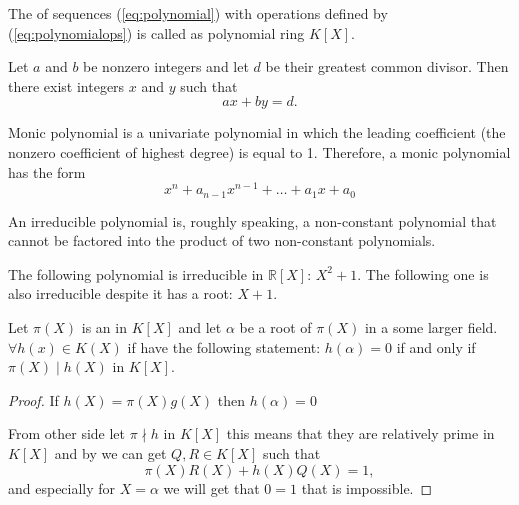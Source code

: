 \begin{appendices}
\begin{definition}
  The  of sequences (\ref{eq:polynomial}) with
  operations defined by (\ref{eq:polynomialops}) is called as
  polynomial ring $K\left[X\right]$.
  \label{def:polynomial}
\end{definition}

\begin{lemma}
  Let $a$ and $b$ be nonzero integers and let $d$ be their greatest common
  divisor. Then there exist integers $x$ and $y$ such that 
  \[
  a x + by = d.
  \]
  \label{lem:bezout}
\end{lemma}

\begin{definition}
  Monic polynomial is a univariate polynomial in which the leading
  coefficient (the nonzero coefficient of highest degree) is equal to
  1. Therefore, a monic polynomial has the form
  \[
  x^n + a_{n-1}x^{n-1}+ \dots + a_1 x + a_0
  \]
  \label{def:monicpolynomial}
\end{definition}

\begin{definition}
  An irreducible polynomial is, roughly speaking, a non-constant
  polynomial that cannot be factored into the product of two
  non-constant polynomials.
  \label{def:irreducible}
\end{definition}

\begin{example}
  The following polynomial is irreducible in
  $\mathbb{R}\left[X\right]$: $X^2 + 1$. The following one is also
  irreducible despite it has a root: $X+1$.
  \label{ex:irreducible}
\end{example}

\begin{theorem}
  Let $\pi(X)$ is an  in $K\left[X\right]$ and let
  $\alpha$ be a root of $\pi(X)$ in a some larger field.
  $\forall h(x) \in K\left(X\right)$ if have the following statement:
  $h\left(\alpha\right) = 0$ if and only if $\pi(X) \mid h(X)$ in
  $K\left[X\right]$.
  \begin{proof}
    If $h(X) = \pi(X) g(X)$ then $h(\alpha) = 0$

    From other side let $\pi \nmid h$ in $K\left[X\right]$ this means
    that they are relatively prime in $K\left[X\right]$ and by
     we can get $Q,R \in K\left[X\right]$ such
    that
    \[
    \pi(X) R(X) + h(X) Q(X) = 1,
    \]
    and especially for $X = \alpha$ we will get that $0 = 1$ that is
    impossible. 
  \end{proof}
  \label{thm:irreduciblediv}
\end{theorem}


\end{appendices}

